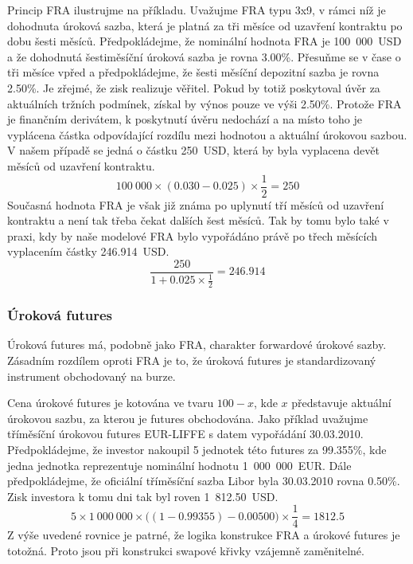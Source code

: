 \documentclass[a4paper]{book}
\begin{document}
Princip FRA ilustrujme na příkladu. Uvažujme FRA typu 3x9, v rámci níž je dohodnuta úroková sazba, která je platná za tři měsíce od uzavření kontraktu po dobu šesti měsíců. Předpokládejme, že nominální hodnota FRA je 100~000~USD a že dohodnutá šestiměsíční úroková sazba je rovna 3.00\%. Přesuňme se v čase o tři měsíce vpřed a předpokládejme, že šesti měsíční depozitní sazba je rovna 2.50\%. Je zřejmé, že zisk realizuje věřitel. Pokud by totiž poskytoval úvěr za aktuálních tržních podmínek, získal by výnos pouze ve výši 2.50\%. Protože FRA je finančním derivátem, k poskytnutí úvěru nedochází a na místo toho je vyplácena částka odpovídající rozdílu mezi hodnotou a aktuální úrokovou sazbou. V našem případě se jedná o částku 250~USD, která by byla vyplacena devět měsíců od uzavření kontraktu.
\begin{equation*}
100~000 \times (0.030 - 0.025) \times \frac{1}{2} = 250
\end{equation*}
Současná hodnota FRA je však již známa po uplynutí tří měsíců od uzavření kontraktu a není tak třeba čekat dalších šest měsíců. Tak by tomu bylo také v praxi, kdy by naše modelové FRA bylo vypořádáno právě po třech měsících vyplacením částky 246.914~USD.
\begin{equation*}
\frac{250}{1 + 0.025 \times \frac{1}{2}} = 246.914
\end{equation*}

\subsubsection{Úroková futures}

Úroková futures má, podobně jako FRA, charakter forwardové úrokové sazby. Zásadním rozdílem oproti FRA je to, že úroková futures je standardizovaný instrument obchodovaný na burze.

Cena úrokové futures je kotována ve tvaru $100 - x$, kde $x$ představuje aktuální úrokovou sazbu, za kterou je futures obchodována. Jako příklad uvažujme tříměsíční úrokovou futures EUR-LIFFE s datem vypořádání 30.03.2010. Předpokládejme, že investor nakoupil 5 jednotek této futures za 99.355\%, kde jedna jednotka reprezentuje nominální hodnotu 1~000~000~EUR. Dále předpokládejme, že oficiální tříměsíční sazba Libor byla 30.03.2010 rovna 0.50\%. Zisk investora k tomu dni tak byl roven 1~812.50~USD.
\begin{equation*}
5 \times 1~000~000 \times \big( (1 - 0.99355) - 0.00500 \big) \times \frac{1}{4} = 1812.5
\end{equation*} 
Z výše uvedené rovnice je patrné, že logika konstrukce FRA a úrokové futures je totožná. Proto jsou při konstrukci swapové křivky vzájemně zaměnitelné.
\end{document}
